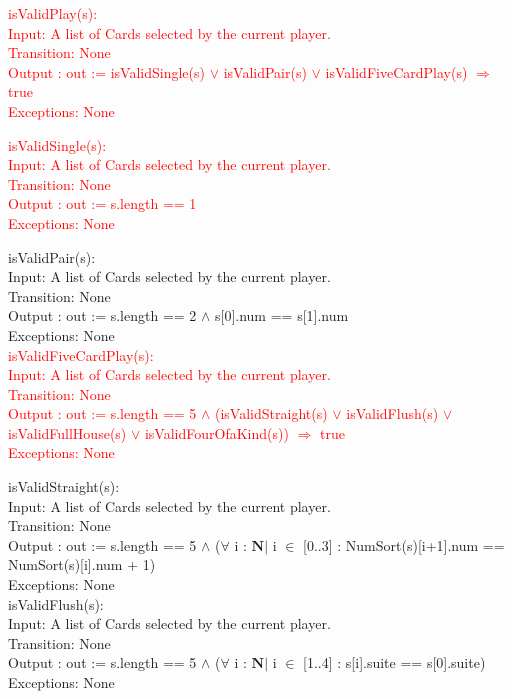 \documentclass[12pt, titlepage]{article}
\begin{document}
\noindent \textcolor{red}{isValidPlay(s):\\
Input: A list of Cards selected by the current player.\\
Transition: None\\
Output : out := isValidSingle(s) $\lor$ isValidPair(s) $\lor$ isValidFiveCardPlay(s) $\Rightarrow$ true\\
Exceptions: None\\} 

\noindent \textcolor{red}{isValidSingle(s):\\
Input: A list of Cards selected by the current player.\\
Transition: None\\
Output : out := s.length == 1\\
Exceptions: None\\} 

\noindent isValidPair(s):\\
Input: A list of Cards selected by the current player.\\
Transition: None\\
Output : out := s.length == 2 $\land$ s[0].num == s[1].num\\
Exceptions: None\\

\noindent \textcolor{red}{isValidFiveCardPlay(s):\\
Input: A list of Cards selected by the current player.\\
Transition: None\\
Output : out := s.length == 5 $\land$ (isValidStraight(s) $\lor$ isValidFlush(s) $\lor$ isValidFullHouse(s) $\lor$ isValidFourOfaKind(s)) $\Rightarrow$ true\\
Exceptions: None\\} 

\noindent isValidStraight(s):\\
Input: A list of Cards selected by the current player.\\
Transition: None\\
Output : out := s.length == 5 $\land$ ($\forall$ i : $\mathbf{N} |$ i $\in$ [0..3] : NumSort(s)[i+1].num == NumSort(s)[i].num + 1) \\
Exceptions: None\\

\noindent isValidFlush(s):\\
Input: A list of Cards selected by the current player.\\
Transition: None\\
Output : out := s.length == 5 $\land$ ($\forall$ i : $\mathbf{N} |$ i $\in$ [1..4] : s[i].suite == s[0].suite) \\
Exceptions: None\\
\end{document}
